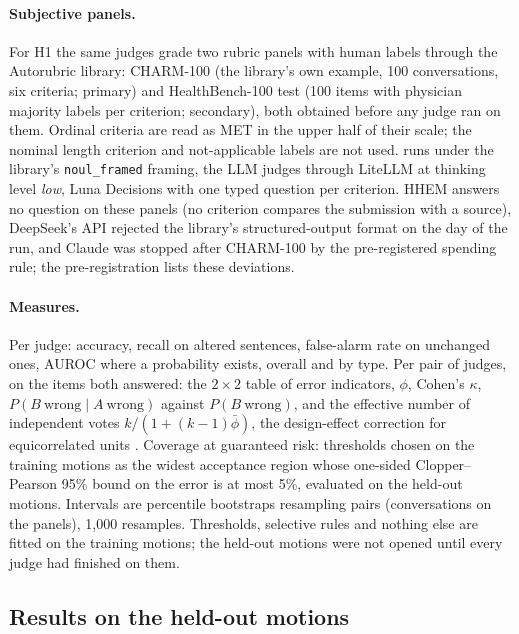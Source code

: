 \paragraph{Subjective panels.} For H1 the same judges grade two rubric panels with human labels through the Autorubric library: CHARM-100 (the library's own example, 100 conversations, six criteria; primary) and HealthBench-100 test (100 items with physician majority labels per criterion; secondary), both obtained before any judge ran on them. Ordinal criteria are read as MET in the upper half of their scale; the nominal length criterion and not-applicable labels are not used. \jev{} runs under the library's \texttt{noul\_framed} framing, the LLM judges through LiteLLM at thinking level \emph{low}, Luna Decisions with one typed question per criterion. HHEM answers no question on these panels (no criterion compares the submission with a source), DeepSeek's API rejected the library's structured-output format on the day of the run, and Claude was stopped after CHARM-100 by the pre-registered spending rule; the pre-registration lists these deviations.

\paragraph{Measures.} Per judge: accuracy, recall on altered sentences, false-alarm rate on unchanged ones, AUROC where a probability exists, overall and by type. Per pair of judges, on the items both answered: the $2\times2$ table of error indicators, $\phi$, Cohen's $\kappa$, $P(B\ \text{wrong} \mid A\ \text{wrong})$ against $P(B\ \text{wrong})$, and the effective number of independent votes $k/(1+(k-1)\bar\phi)$, the design-effect correction for equicorrelated units \citep{kish1965survey}. Coverage at guaranteed risk: thresholds chosen on the training motions as the widest acceptance region whose one-sided Clopper--Pearson 95\% bound on the error is at most 5\%, evaluated on the held-out motions. Intervals are percentile bootstraps resampling pairs (conversations on the panels), 1,000 resamples. Thresholds, selective rules and nothing else are fitted on the training motions; the held-out motions were not opened until every judge had finished on them.

\subsection{Results on the held-out motions}

\begin{table}[t]
\centering\small
{}
\caption{Every judge of Study 2 as a binary contradiction detector on the held-out motions, all five perturbation types pooled (the label rate is 50\% by construction). Claude Sonnet 5.5 was run on 400 of the 807 held-out pairs.}
\label{tab:study-judges}
\end{table}

